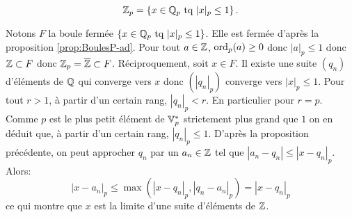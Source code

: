 \begin{propn} \label{prop:CaracEntierP-adiq}
 \begin{displaymath}
  \mathbb{Z}_p = \left\lbrace x\in \mathbb{Q}_p \text{ tq } |x|_p \leq 1\right\rbrace.
 \end{displaymath}
\end{propn}
\begin{demo}
Notons  $F$ la boule fermée $\left\lbrace x\in \mathbb{Q}_p \text{ tq } |x|_p \leq 1\right\rbrace$. Elle est fermée d'après la proposition \ref{prop:BoulesP-ad}.\newline
Pour tout $a\in \mathbb{Z}$, $\mathop{\mathrm{ord}}_p(a)\geq 0$ donc $|a|_p \leq 1$ donc $\mathbb{Z} \subset F$ donc $\mathbb{Z}_p = \overline{\mathbb{Z}}\subset F$.\newline
Réciproquement, soit $x \in F$. Il existe une suite $(q_n)$ d'éléments de $\mathbb{Q}$ qui converge vers $x$ donc $(|q_n|_p)$ converge vers $|x|_p\leq 1$.\newline
Pour tout $r>1$, à partir d'un certain rang, $|q_n|_p < r$. En particulier pour $r = p$. Comme $p$ est le plus petit élément de $\mathbb{V}_p^*$ strictement plus grand que $1$ on en déduit que,   à partir d'un certain rang, $|q_n|_p\leq 1$. D'après la proposition précédente, on peut approcher $q_n$ par un $a_n \in \mathbb{Z}$ tel que $|a_n - q_n|\leq |x-q_n|_p$. Alors:
\begin{displaymath}
 |x-a_n|_p \leq \max(|x-q_n|_p, |q_n - a_n|_p) = |x-q_n|_p
\end{displaymath}
ce qui montre que $x$ est la limite d'une suite d'éléments de $\mathbb{Z}$.
\end{demo}

